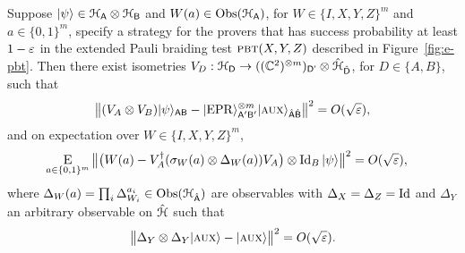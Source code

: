   \begin{lemma}
Suppose $|\psi\rangle\in\mathcal{H}_{\textsf{A}}\otimes \mathcal{H}_{\textsf{B}}$ and $W(a) \in \mathrm{Obs}(\mathcal{H}_{\textsf{A}})$, for $W\in \{I,X,Y,Z\}^m$ and $a\in\{0,1\}^m$, specify a strategy for the provers that has success probability at least $1-\varepsilon$ in the extended Pauli braiding test $\textsc{pbt}(X,Y,Z)$ described in Figure~\ref{fig:e-pbt}. 
Then there exist isometries $V_D:\mathcal{H}_{\textsf{D}} \to (({\mathbb C}^2)^{\otimes m})_{{\textsf{D'}}}  \otimes \hat{\mathcal{H}}_{\hat{{\textsf{D}}}}$, for $D\in\{A,B\}$, such that
$$\big\| (V_A \otimes V_B) |\psi\rangle_{{\textsf{AB}}} - |{\rm EPR}\rangle_{{\textsf{A}}'{\textsf{B}}'}^{\otimes m} |\textsc {aux}\rangle_{\hat{{\textsf{A}}}\hat{{\textsf{B}}}} \big\|^2 = O(\sqrt{\varepsilon}),$$
and on expectation over  $W\in \{I,X,Y,Z\}^m$,
\begin{align}\label{eq:test-sigmay-2}
 \mathop{\textsc{E}}_{a\in\{0,1\}^m} \big\| \big(W(a) -V_A^\dagger (\sigma_W(a) \otimes \Delta_W(a)) V_A\big) \otimes \mathop{\rm Id}\nolimits_B |\psi\rangle \big\|^2 &= O(\sqrt{\varepsilon}),
\end{align}
where $\Delta_W(a) = \prod_i \Delta_{W_i}^{a_i} \in \mathrm{Obs}({\mathcal{H}}_{\hat{{\textsf{A}}}})$ are observables with $\Delta_{X}=\Delta_{Z}=\mathop{\rm Id}\nolimits$ and $\Delta_{Y}$ an arbitrary observable on $\hat{\mathcal{H}}$ such that
	$$ \big\|\Delta_Y \otimes \Delta_Y |\textsc {aux}\rangle - |\textsc {aux}\rangle \big\|^2 = O(\sqrt{\varepsilon}).$$
\end{lemma}
